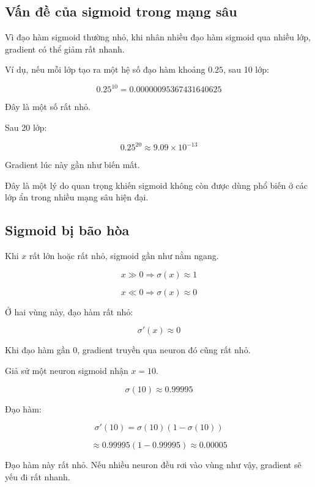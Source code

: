 \subsection{Vấn đề của sigmoid trong mạng sâu}

Vì đạo hàm sigmoid thường nhỏ, khi nhân nhiều đạo hàm sigmoid qua nhiều lớp, gradient có thể giảm rất nhanh.

Ví dụ, nếu mỗi lớp tạo ra một hệ số đạo hàm khoảng $0.25$, sau 10 lớp:

\[
    0.25^{10}
    =
    0.00000095367431640625
\]

Đây là một số rất nhỏ.

Sau 20 lớp:

\[
    0.25^{20}
    \approx 9.09 \times 10^{-13}
\]

Gradient lúc này gần như biến mất.

\begin{canhbao}
Đây là một lý do quan trọng khiến sigmoid không còn được dùng phổ biến ở các lớp ẩn trong nhiều mạng sâu hiện đại.
\end{canhbao}

\subsection{Sigmoid bị bão hòa}

Khi $x$ rất lớn hoặc rất nhỏ, sigmoid gần như nằm ngang.

\[
    x \gg 0 \Rightarrow \sigma(x)\approx 1
\]

\[
    x \ll 0 \Rightarrow \sigma(x)\approx 0
\]

Ở hai vùng này, đạo hàm rất nhỏ:

\[
    \sigma'(x)\approx 0
\]

Khi đạo hàm gần 0, gradient truyền qua neuron đó cũng rất nhỏ.

\begin{vidu}
Giả sử một neuron sigmoid nhận $x=10$.

\[
    \sigma(10)\approx 0.99995
\]

Đạo hàm:

\[
    \sigma'(10)
    =
    \sigma(10)(1-\sigma(10))
\]

\[
    \approx
    0.99995(1-0.99995)
    \approx 0.00005
\]

Đạo hàm này rất nhỏ. Nếu nhiều neuron đều rơi vào vùng như vậy, gradient sẽ yếu đi rất nhanh.
\end{vidu}

